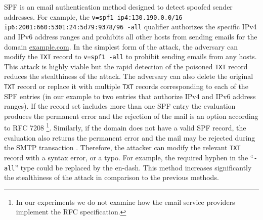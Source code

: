 SPF is an email authentication method designed to detect spoofed sender addresses. %
For example, the %
\texttt{v=spf1 ip4:130.190.0.0/16} \texttt{ip6:2001:660:5301:24:5d79:9378/96 -all} qualifier %
authorizes the specific IPv4 and IPv6 address ranges 
and prohibits all other hosts from sending emails for the domain \url{example.com}.
%
In the simplest form of the attack, the adversary can modify the \texttt{TXT} record to \texttt{v=spf1 -all} to prohibit sending emails from any hosts. %
This attack is highly viable but the rapid detection of the poisoned \texttt{TXT} record reduces the stealthiness of the attack. %
The adversary can also delete the original \texttt{TXT} record or replace it with multiple \texttt{TXT} records corresponding to each of the SPF entries (in our example to two entries that authorize IPv4 and IPv6 address ranges). %
If the record set includes more than one SPF entry the evaluation produces the  permanent error and the rejection of the mail is an option according to RFC 7208 \cite{spf}\footnote{In our experiments we do not examine how the email service providers implement the RFC specification.}.
%
%
%
%
Similarly, if the domain does not have a valid SPF record, %
the evaluation also returns the permanent error and the mail may be rejected during the SMTP transaction \cite{spf}.
%
%
Therefore, the attacker can modify %
the relevant \texttt{TXT} record with a syntax error, or a typo. 
For example, the required hyphen in the ``\texttt{-all}'' type could be replaced by the en-dash. %
This method increases significantly the stealthiness of the attack in comparison to the previous methods. 


